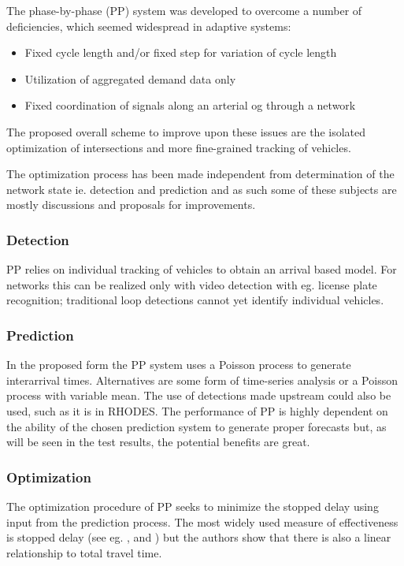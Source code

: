 The phase-by-phase (PP) system was developed to overcome a number of
deficiencies, which seemed widespread in adaptive systems:

\begin{itemize}
\item Fixed cycle length and/or fixed step for variation of cycle length
\item Utilization of aggregated demand data only
\item Fixed coordination of signals along an arterial og through a network
\end{itemize}

The proposed overall scheme to improve upon these issues are the
isolated optimization of intersections and more fine-grained tracking
of vehicles.

The optimization process has been made independent from determination
of the network state ie. detection and prediction and as such some of
these subjects are mostly discussions and proposals for improvements.

\subsubsection*{Detection}

PP relies on individual tracking of vehicles to obtain an arrival
based model. For networks this can be realized only with video
detection with eg. license plate recognition; traditional loop
detections cannot yet identify individual vehicles.

\subsubsection*{Prediction}

In the proposed form the PP system uses a Poisson process to generate
interarrival times.  Alternatives are some form of time-series
analysis or a Poisson process with variable mean. The use of
detections made upstream could also be used, such as it is in RHODES.
The performance of PP is highly dependent on the ability of the chosen
prediction system to generate proper forecasts but, as will be seen in
the test results, the potential benefits are great.

\subsubsection*{Optimization}

The optimization procedure of PP seeks to minimize the stopped delay
using input from the prediction process. The most widely used measure
of effectiveness is stopped delay (see eg. \cite{9}, \cite{38} and
\cite{31}) but the authors show that there is also a linear
relationship to total travel time.

